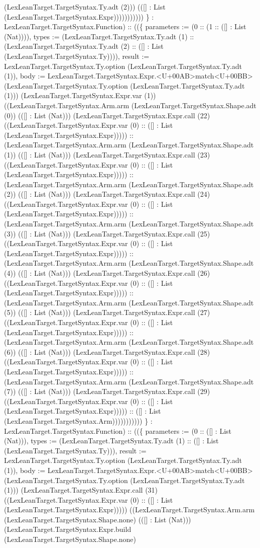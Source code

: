 \documentclass[11pt]{article}
\begin{document}
(LexLeanTarget.TargetSyntax.Ty.adt (2))) (([] : List (LexLeanTarget.TargetSyntax.Expr))))))))))) \} : LexLeanTarget.TargetSyntax.Function) :: ((\{ parameters := (0 :: (1 :: ([] : List (Nat)))), types := (LexLeanTarget.TargetSyntax.Ty.adt (1) :: (LexLeanTarget.TargetSyntax.Ty.adt (2) :: ([] : List (LexLeanTarget.TargetSyntax.Ty)))), result := LexLeanTarget.TargetSyntax.Ty.option (LexLeanTarget.TargetSyntax.Ty.adt (1)), body := LexLeanTarget.TargetSyntax.Expr.<U+00AB>match<U+00BB> (LexLeanTarget.TargetSyntax.Ty.option (LexLeanTarget.TargetSyntax.Ty.adt (1))) (LexLeanTarget.TargetSyntax.Expr.var (1)) ((LexLeanTarget.TargetSyntax.Arm.arm (LexLeanTarget.TargetSyntax.Shape.adt (0)) (([] : List (Nat))) (LexLeanTarget.TargetSyntax.Expr.call (22) ((LexLeanTarget.TargetSyntax.Expr.var (0) :: ([] : List (LexLeanTarget.TargetSyntax.Expr))))) :: (LexLeanTarget.TargetSyntax.Arm.arm (LexLeanTarget.TargetSyntax.Shape.adt (1)) (([] : List (Nat))) (LexLeanTarget.TargetSyntax.Expr.call (23) ((LexLeanTarget.TargetSyntax.Expr.var (0) :: ([] : List (LexLeanTarget.TargetSyntax.Expr))))) :: (LexLeanTarget.TargetSyntax.Arm.arm (LexLeanTarget.TargetSyntax.Shape.adt (2)) (([] : List (Nat))) (LexLeanTarget.TargetSyntax.Expr.call (24) ((LexLeanTarget.TargetSyntax.Expr.var (0) :: ([] : List (LexLeanTarget.TargetSyntax.Expr))))) :: (LexLeanTarget.TargetSyntax.Arm.arm (LexLeanTarget.TargetSyntax.Shape.adt (3)) (([] : List (Nat))) (LexLeanTarget.TargetSyntax.Expr.call (25) ((LexLeanTarget.TargetSyntax.Expr.var (0) :: ([] : List (LexLeanTarget.TargetSyntax.Expr))))) :: (LexLeanTarget.TargetSyntax.Arm.arm (LexLeanTarget.TargetSyntax.Shape.adt (4)) (([] : List (Nat))) (LexLeanTarget.TargetSyntax.Expr.call (26) ((LexLeanTarget.TargetSyntax.Expr.var (0) :: ([] : List (LexLeanTarget.TargetSyntax.Expr))))) :: (LexLeanTarget.TargetSyntax.Arm.arm (LexLeanTarget.TargetSyntax.Shape.adt (5)) (([] : List (Nat))) (LexLeanTarget.TargetSyntax.Expr.call (27) ((LexLeanTarget.TargetSyntax.Expr.var (0) :: ([] : List (LexLeanTarget.TargetSyntax.Expr))))) :: (LexLeanTarget.TargetSyntax.Arm.arm (LexLeanTarget.TargetSyntax.Shape.adt (6)) (([] : List (Nat))) (LexLeanTarget.TargetSyntax.Expr.call (28) ((LexLeanTarget.TargetSyntax.Expr.var (0) :: ([] : List (LexLeanTarget.TargetSyntax.Expr))))) :: (LexLeanTarget.TargetSyntax.Arm.arm (LexLeanTarget.TargetSyntax.Shape.adt (7)) (([] : List (Nat))) (LexLeanTarget.TargetSyntax.Expr.call (29) ((LexLeanTarget.TargetSyntax.Expr.var (0) :: ([] : List (LexLeanTarget.TargetSyntax.Expr))))) :: ([] : List (LexLeanTarget.TargetSyntax.Arm))))))))))) \} : LexLeanTarget.TargetSyntax.Function) :: ((\{ parameters := (0 :: ([] : List (Nat))), types := (LexLeanTarget.TargetSyntax.Ty.adt (1) :: ([] : List (LexLeanTarget.TargetSyntax.Ty))), result := LexLeanTarget.TargetSyntax.Ty.option (LexLeanTarget.TargetSyntax.Ty.adt (1)), body := LexLeanTarget.TargetSyntax.Expr.<U+00AB>match<U+00BB> (LexLeanTarget.TargetSyntax.Ty.option (LexLeanTarget.TargetSyntax.Ty.adt (1))) (LexLeanTarget.TargetSyntax.Expr.call (31) ((LexLeanTarget.TargetSyntax.Expr.var (0) :: ([] : List (LexLeanTarget.TargetSyntax.Expr))))) ((LexLeanTarget.TargetSyntax.Arm.arm (LexLeanTarget.TargetSyntax.Shape.none) (([] : List (Nat))) (LexLeanTarget.TargetSyntax.Expr.build (LexLeanTarget.TargetSyntax.Shape.none) 
\end{document}
